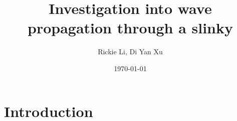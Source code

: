 \documentclass{article}
\title{Investigation into wave propagation through a slinky}
\author{Rickie Li, Di Yan Xu}
\date{\today}
\begin{document}
\maketitle

\newpage

\section{Introduction}
\end{document}
